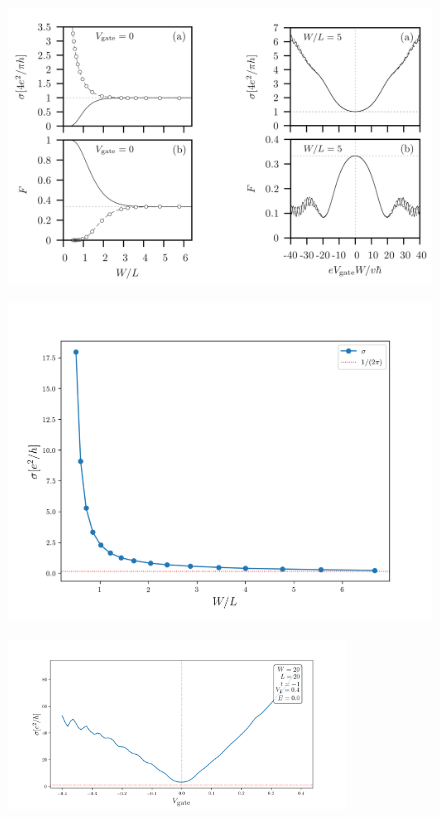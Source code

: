 \documentclass[12pt]{article}
\numberwithin{equation}{section}
\begin{document}
\newpage
\begin{figure}[h!]
  \begin{center}
  \includegraphics[height=0.75\textheight]{./media/graphene-from-article.png}
  \end{center}
\end{figure}

\newpage
\begin{figure}[h!]
  \begin{center}
  \includegraphics[height=0.75\textheight]{./media/graphene_conductivity_WL.png}
  \end{center}
\end{figure}

\newpage
\begin{figure}[h!]
  \begin{center}
  \includegraphics[width=0.8\textwidth]{./media/graphene_minimal_vg_l_0-4.png}
  \end{center}
\end{figure}
\end{document}

